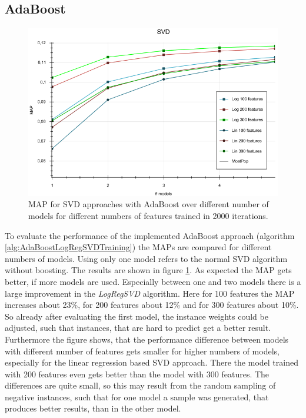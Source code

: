 \documentclass[10pt]{reportMaster}
\begin{document}
\subsection*{AdaBoost}
\begin{figure}[h!]
	\centering
	\includegraphics[width=1\textwidth]{figures/experiments/SVDModels}
	\caption[MAPs for AdaBoost over number of models]{MAP for SVD approaches with AdaBoost over different number of models for different numbers of features trained in 2000 iterations.}
	\label{fig:SVDModels}
\end{figure}

To evaluate the performance of the implemented AdaBoost approach (algorithm \ref{alg:AdaBoostLogRegSVDTraining}) the MAPs are compared for different numbers of models.
Using only one model refers to the normal SVD algorithm without boosting.
The results are shown in figure \ref{fig:SVDModels}.
As expected the MAP gets better, if more models are used.
Especially between one and two models there is a large improvement in the \textit{LogRegSVD} algorithm.
Here for 100 features the MAP increases about 23\%, for 200 features about 12\% and for 300 features about 10\%.
So already after evaluating the first model, the instance weights could be adjusted, such that instances, that are hard to predict get a better result. 
Furthermore the figure shows, that the performance difference between models with different number of features gets smaller for higher numbers of models, especially for the linear regression based SVD approach.
There the model trained with 200 features even gets better than the model with 300 features.
The differences are quite small, so this may result from the random sampling of negative instances, such that for one model a sample was generated, that produces better results, than in the other model.
\end{document}
